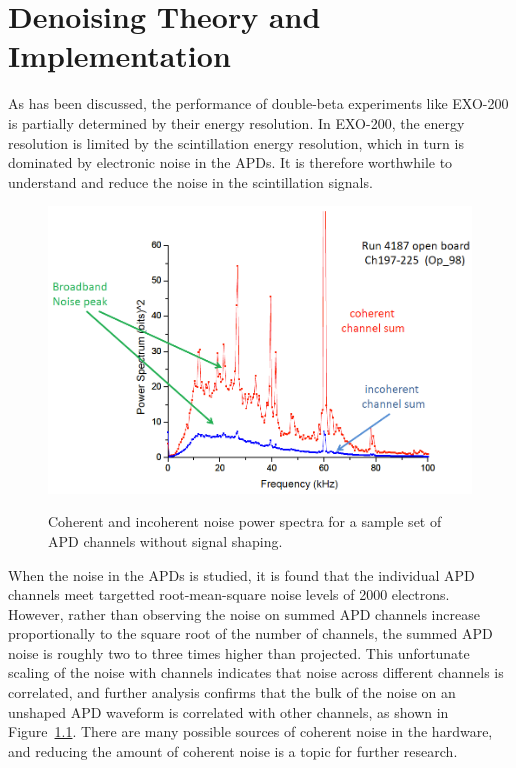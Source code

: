 \renewcommand{\thechapter}{4}
\chapter{Denoising Theory and Implementation}
\label{ch:DenoisingTheory}

As has been discussed, the performance of double-beta experiments like EXO-200 is partially determined by their energy resolution.  In EXO-200, the energy resolution is limited by the scintillation energy resolution, which in turn is dominated by electronic noise in the APDs.  It is therefore worthwhile to understand and reduce the noise in the scintillation signals.

\begin{figure}
\begin{center}
\includegraphics[keepaspectratio=true,width=\textwidth]{APDNoisePowerSpectrum.png}
\end{center}
\renewcommand{\baselinestretch}{1}
\small\normalsize
\begin{quote}
\caption{Coherent and incoherent noise power spectra for a sample set of APD channels without signal shaping.~\cite{ElectronicsUpgradeReport}}
\label{fig:APDNoisePowerSpectrum}
\end{quote}
\end{figure}
\renewcommand{\baselinestretch}{2}
\small\normalsize

When the noise in the APDs is studied, it is found that the individual APD channels meet targetted root-mean-square noise levels of 2000 electrons.~\cite{ElectronicsUpgradeReport}  However, rather than observing the noise on summed APD channels increase proportionally to the square root of the number of channels, the summed APD noise is roughly two to three times higher than projected.  This unfortunate scaling of the noise with channels indicates that noise across different channels is correlated, and further analysis confirms that the bulk of the noise on an unshaped APD waveform is correlated with other channels, as shown in Figure~\ref{fig:APDNoisePowerSpectrum}.  There are many possible sources of coherent noise in the hardware, and reducing the amount of coherent noise is a topic for further research.~\cite{ElectronicsUpgradeReport}


